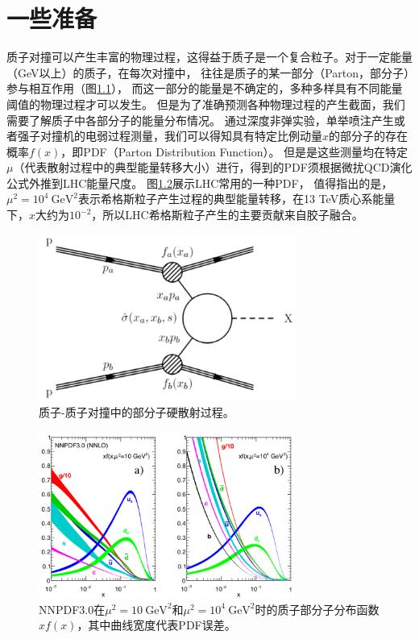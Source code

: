 \chapter{一些准备}
质子对撞可以产生丰富的物理过程，这得益于质子是一个复合粒子。对于一定能量（GeV以上）的质子，在每次对撞中，
往往是质子的某一部分（Parton，部分子）参与相互作用（图\ref{fig:pp_collision}），
而这一部分的能量是不确定的，多种多样具有不同能量阈值的物理过程才可以发生。
但是为了准确预测各种物理过程的产生截面，我们需要了解质子中各部分子的能量分布情况。
通过深度非弹实验\cite{Kuhlen:390284}，单举喷注产生\cite{Aad2015-pdf}或者强子对撞机的电弱过程测量\cite{Khachatryan2016,Khachatryan2015}，我们可以得知具有特定比例动量$x$的部分子的存在概率$f(x)$，即PDF（Parton Distribution Function）。
但是是这些测量均在特定$\mu$（代表散射过程中的典型能量转移大小）进行，得到的PDF须根据微扰QCD演化公式\cite{ellis_stirling_webber_1996}外推到LHC能量尺度。
图\ref{fig:NNPDF3}展示LHC常用的一种PDF，
值得指出的是，$\mu^2=10^4~\text{GeV}^2$表示希格斯粒子产生过程的典型能量转移，在13 TeV质心系能量下，$x$大约为$10^{-2}$，所以LHC希格斯粒子产生的主要贡献来自胶子融合。
\begin{figure}[h]
\centering
 \includegraphics[width=0.75\textwidth]{fig/inclusive_pp.png}
 \caption{质子-质子对撞中的部分子硬散射过程。}
 \label{fig:pp_collision}
\end{figure}
\begin{figure}[h]
\centering
 \includegraphics[width=0.75\textwidth]{fig/NNPDF3.png}
 \caption{NNPDF3.0\cite{24}在$\mu^2=10~\text{GeV}^2$和$\mu^2=10^4~\text{GeV}^2$时的质子部分子分布函数$xf(x)$，其中曲线宽度代表PDF误差。}
 \label{fig:NNPDF3}
\end{figure}
